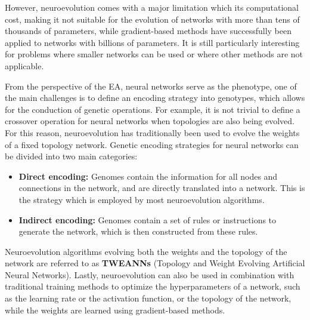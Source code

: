 However, neuroevolution comes with a major limitation which its computational cost, making it not suitable for the evolution of networks with more than
tens of thousands of parameters, while gradient-based methods have successfully been applied to networks with billions of parameters. It is still particularly
interesting for problems where smaller networks can be used or where other methods are not applicable.

From the perspective of the EA, neural networks serve as the phenotype, one of the main challenges is to define an encoding strategy into genotypes, which
allows for the conduction of genetic operations. For example, it is not trivial to define a crossover operation for neural networks when topologies are also
being evolved. For this reason, neuroevolution has traditionally  been used to evolve the weights of a fixed topology network. Genetic encoding strategies
for neural networks can be divided into two main categories:

\begin{itemize}
    \item \textbf{Direct encoding:} Genomes contain the information for all nodes and connections in the network, and are directly translated into a network. This
    is the strategy which is employed by most neuroevolution algorithms.
    \item \textbf{Indirect encoding:} Genomes contain a set of rules or instructions to generate the network, which is then constructed from these rules.
\end{itemize}

Neuroevolution algorithms evolving both the weights and the topology of the network are referred to as \textbf{TWEANNs} (Topology and Weight Evolving Artificial Neural Networks).
Lastly, neuroevolution can also be used in combination with traditional training methods to optimize the hyperparameters of a network, such as the learning rate or the
activation function, or the topology of the network, while the weights are learned using gradient-based methods.
